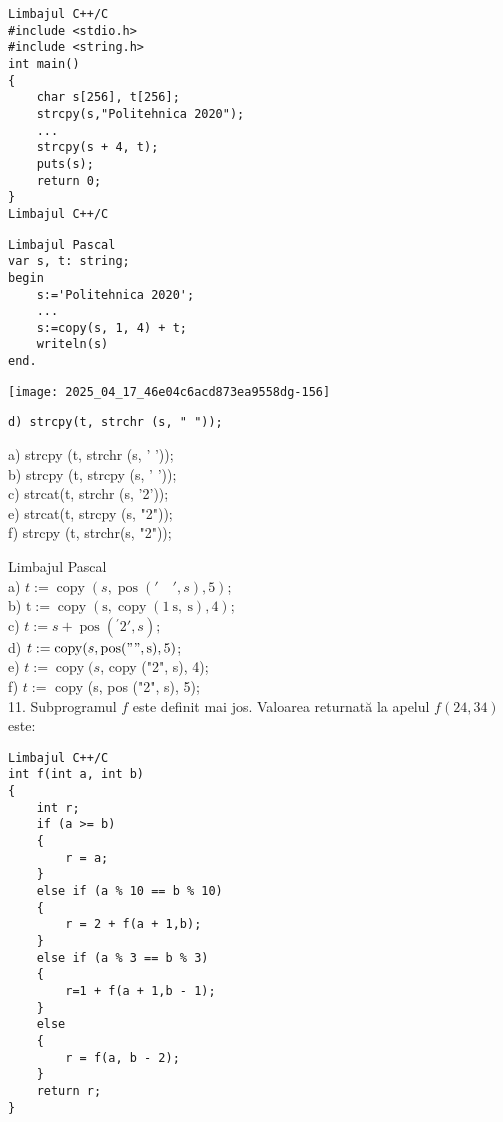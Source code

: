 \begin{verbatim}
Limbajul C++/C
#include <stdio.h>
#include <string.h>
int main()
{
    char s[256], t[256];
    strcpy(s,"Politehnica 2020");
    ...
    strcpy(s + 4, t);
    puts(s);
    return 0;
}
Limbajul C++/C
\end{verbatim}

\begin{verbatim}
Limbajul Pascal
var s, t: string;
begin
    s:='Politehnica 2020';
    ...
    s:=copy(s, 1, 4) + t;
    writeln(s)
end.
\end{verbatim}

\begin{center}
\texttt{[image: 2025\_04\_17\_46e04c6acd873ea9558dg-156]}
\end{center}

\begin{verbatim}
d) strcpy(t, strchr (s, " "));
\end{verbatim}

a) strcpy (t, strchr (s, ' '));\\
b) strcpy (t, strcpy (s, ' '));\\
c) strcat(t, strchr (s, '2'));\\
e) strcat(t, strcpy (s, "2"));\\
f) strcpy (t, strchr(s, "2"));

Limbajul Pascal\\
a) $t:=\operatorname{copy}(s, \operatorname{pos}(' \quad ', s), 5)$;\\
b) $\mathrm{t}:=\operatorname{copy}(\mathrm{s}, \operatorname{copy}(1 \mathrm{~s}, \mathrm{~s}), 4)$;\\
c) $t:=s+\operatorname{pos}\left({ }^{\prime} 2 ', s\right) ;$\\
d) $t:=\operatorname{copy}(s, \operatorname{pos}(" \mathrm{"}, \mathrm{s}), 5)$;\\
e) $t:=\operatorname{copy}(s$, copy ("2", s), 4);\\
f) $t:=$ copy (s, pos ("2", s), 5);\\
11. Subprogramul $f$ este definit mai jos. Valoarea returnată la apelul $f(24,34)$ este:

\begin{verbatim}
Limbajul C++/C
int f(int a, int b)
{
    int r;
    if (a >= b)
    {
        r = a;
    }
    else if (a % 10 == b % 10)
    {
        r = 2 + f(a + 1,b);
    }
    else if (a % 3 == b % 3)
    {
        r=1 + f(a + 1,b - 1);
    }
    else
    {
        r = f(a, b - 2);
    }
    return r;
}
\end{verbatim}

